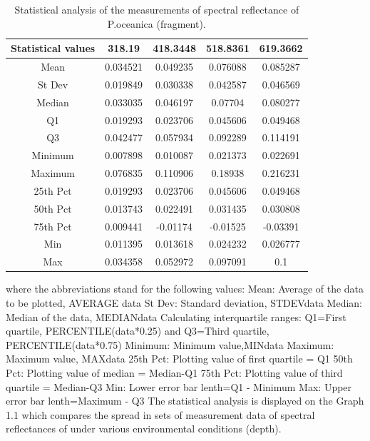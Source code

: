 \documentclass[10pt, a4paper]{article}
\begin{document}
\begin{table}
\caption{Statistical analysis of the measurements of spectral reflectance of P.oceanica (fragment).}
\centering
  \begin{tabular}{| c | c | c | c | c |}
    \hline
   	 \textbf{Statistical values} & \textbf{318.19} & \textbf{418.3448} & \textbf{518.8361} & \textbf{619.3662} \\ \hline \hline
	    Mean & 0.034521 & 0.049235 & 0.076088 & 0.085287 \\ \hline
	    St Dev & 0.019849 & 0.030338 & 0.042587 & 0.046569 \\ \hline
	   Median & 0.033035 & 0.046197 & 0.07704 & 0.080277 \\ \hline
	   Q1 & 0.019293 & 0.023706 & 0.045606& 0.049468 \\ \hline
	   Q3 & 0.042477 & 0.057934 & 0.092289 & 0.114191 \\ \hline
	   Minimum & 0.007898 & 0.010087 & 0.021373 & 0.022691 \\ \hline
	   Maximum & 0.076835 & 0.110906 & 0.18938 & 0.216231 \\ \hline
	   25th Pct & 0.019293 & 0.023706 & 0.045606 & 0.049468 \\ \hline
	   50th Pct & 0.013743 & 0.022491 & 0.031435 & 0.030808 \\ \hline
	   75th Pct & 0.009441 & -0.01174 & -0.01525 & -0.03391 \\ \hline
	   Min & 0.011395 & 0.013618 & 0.024232 & 0.026777 \\ \hline
	   Max & 0.034358 & 0.052972 & 0.097091 & 0.1 \\ \hline
  \end{tabular}
   \label{tab:4}
\end{table}

where the abbreviations stand for the following values:
Mean: Average of the data to be plotted, AVERAGE {data}
St Dev: Standard deviation, STDEV{data}
Median: Median of the data, MEDIAN{data}
Calculating interquartile ranges: Q1=First quartile, PERCENTILE({data}*0.25) and Q3=Third
quartile, PERCENTILE({data}*0.75)
Minimum: Minimum value,MIN{data}
Maximum: Maximum value, MAX{data}
25th Pct: Plotting value of first quartile = Q1
50th Pct: Plotting value of median = Median-Q1
75th Pct: Plotting value of third quartile = Median-Q3
Min: Lower error bar lenth=Q1 - Minimum
Max: Upper error bar lenth=Maximum - Q3
The statistical analysis is displayed on the Graph 1.1 which compares the spread in sets of
measurement data of spectral reflectances of under various environmental conditions (depth).
\end{document}
